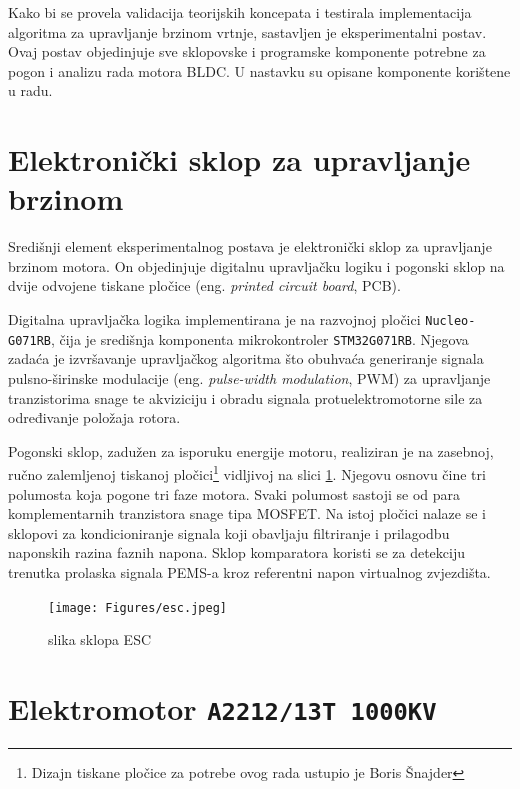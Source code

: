 \documentclass[diplomskirad, upload]{fer}
\begin{document}
Kako bi se provela validacija teorijskih koncepata i testirala implementacija
algoritma za upravljanje brzinom vrtnje, sastavljen je eksperimentalni postav.
Ovaj postav objedinjuje sve sklopovske i programske komponente potrebne za
pogon i analizu rada motora BLDC. U nastavku su opisane komponente korištene u
radu.

\section{Elektronički sklop za upravljanje brzinom}
\label{sec:esc}

Središnji element eksperimentalnog postava je elektronički sklop za upravljanje
brzinom motora. On objedinjuje digitalnu upravljačku logiku i pogonski sklop na
dvije odvojene tiskane pločice (eng. \textit{printed circuit board}, PCB).

Digitalna upravljačka logika implementirana je na razvojnoj pločici
\texttt{Nucleo-G071RB}, čija je središnja komponenta mikrokontroler
\texttt{STM32G071RB}. Njegova zadaća je izvršavanje upravljačkog algoritma što
obuhvaća generiranje signala pulsno-širinske modulacije (eng.
\textit{pulse-width modulation}, PWM) za upravljanje tranzistorima snage te
akviziciju i obradu signala protuelektromotorne sile za određivanje položaja
rotora.

Pogonski sklop, zadužen za isporuku energije motoru, realiziran je na zasebnoj,
ručno zalemljenoj tiskanoj pločici\footnote{Dizajn tiskane pločice za potrebe
	ovog rada ustupio je Boris Šnajder} vidljivoj na slici \ref{fig:esc}. Njegovu
osnovu čine tri polumosta koja pogone tri faze motora. Svaki polumost sastoji
se od para komplementarnih tranzistora snage tipa MOSFET. Na istoj pločici
nalaze se i sklopovi za kondicioniranje signala koji obavljaju filtriranje i
prilagodbu naponskih razina faznih napona. Sklop komparatora koristi se za
detekciju trenutka prolaska signala PEMS-a kroz referentni napon virtualnog
zvjezdišta.
\begin{figure}[h!]
	\centering
	\texttt{[image: Figures/esc.jpeg]}
	\caption{slika sklopa ESC}
	\label{fig:esc}
\end{figure}

\section{Elektromotor \texttt{A2212/13T 1000KV}}
\label{sec:motor}
\end{document}
